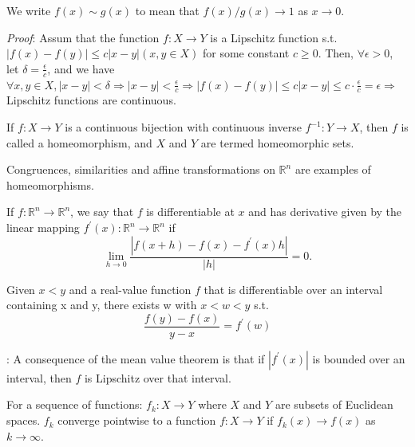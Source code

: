 We write $f(x) \sim g(x)$ to mean that $f(x) / g(x) \rightarrow 1$ as $x \rightarrow 0$.

\begin{theorem}\label{LipschitzContinuous}
\end{theorem}

\textit{Proof}: Assum that the function $f: X \rightarrow Y$ is a Lipschitz function s.t. 
$|f(x)-f(y)| \leq c|x-y| (x, y \in X)$ for some constant $c\geq 0$.
Then, $\forall \epsilon > 0$, let $\displaystyle \delta = \frac{\epsilon}{c}$, and we have
$\forall x, y\in X, |x-y| < \delta \Rightarrow \displaystyle |x-y| < \frac{\epsilon}{c} \Rightarrow |f(x) - f(y)| \leq c |x-y| \leq c\cdot \frac{\epsilon}{c} = \epsilon \Rightarrow$ Lipschitz functions are continuous.

\begin{definition}[Homeomorphism]
    If $f: X \rightarrow Y$ is a continuous bijection with continuous 
    inverse $f^{-1}: Y \rightarrow X$, then $f$ is called a homeomorphism, 
    and $X$ and $Y$ are termed homeomorphic sets. 
\end{definition}
\begin{corollary}
    Congruences, similarities 
    and affine transformations on $\mathbb{R}^{n}$ are examples of homeomorphisms.
\end{corollary}

\begin{definition}[Differentiable]
    If $f: \mathbb{R}^{n} \rightarrow \mathbb{R}^{n}$, we say that $f$ is 
    differentiable at $x$ and has derivative given by the linear mapping 
    $f^{\prime}(x): \mathbb{R}^{n} \rightarrow \mathbb{R}^{n}$ if
$$
\lim _{h \rightarrow 0} \frac{\left|f(x+h)-f(x)-f^{\prime}(x) h\right|}{|h|}=0 .
$$
\end{definition}


\begin{theorem}\label{mvt}
    Given $x < y$ and a real-value function $f$ that is differentiable over an interval containing x and y, there exists w with $x<w<y$ s.t. 
    $$
    \frac{f(y)-f(x)}{y-x} = f^\prime(w)
    $$
\end{theorem}
\note: A consequence of the mean value theorem is that if $|f^\prime (x)|$ is bounded over an interval, then $f$ is Lipschitz over that interval.

\begin{definition}
    For a sequence of functions: $f_k : X\rightarrow Y$ where $X$ and $Y$ are subsets 
    of Euclidean spaces. $f_k$ converge pointwise to a function $f:X\rightarrow Y$ if 
    $f_k(x)\rightarrow f(x)$ as $k\rightarrow \infty$.
\end{definition}

